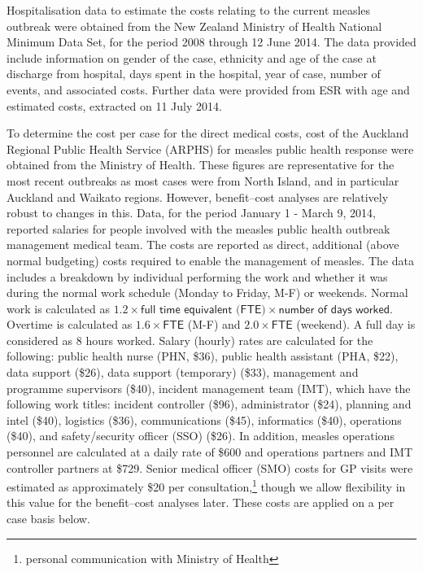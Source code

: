 \documentclass{article}
\begin{document}
Hospitalisation data to estimate the costs relating to the current measles outbreak were obtained from the New Zealand Ministry of Health National Minimum Data Set, for the period 2008 through 12 June 2014. The data provided include information on gender of the case, ethnicity and age of the case at discharge from hospital, days spent in the hospital, year of case, number of events, and associated costs. Further data were provided from ESR with age and estimated costs, extracted on 11 July 2014.

To determine the cost per case for the direct medical costs, cost of the Auckland Regional Public Health Service (ARPHS) for measles public health response were obtained from the Ministry of Health. These figures are representative for the most recent outbreaks as most cases were from North Island, and in particular Auckland and Waikato regions. However, benefit--cost analyses are relatively robust to changes in this. Data, for the period January 1 - March 9, 2014, reported salaries for people involved with the measles public health outbreak management medical team. The costs are reported as direct, additional (above normal budgeting) costs required to enable the management of measles. The data includes a breakdown by individual performing the work and whether it was during the normal work schedule (Monday to Friday, M-F) or weekends. Normal work is calculated as $1.2 \times \textsf{full time equivalent (FTE)} \times \textsf{number of days worked}$. Overtime is calculated as $1.6\times\textsf{FTE}$ (M-F) and $2.0 \times \textsf{FTE}$ (weekend). A full day is considered as 8 hours worked. Salary (hourly) rates are calculated for the following: public health nurse (PHN, \$36), public health assistant (PHA, \$22), data support (\$26), data support (temporary) (\$33), management and programme supervisors (\$40), incident management team (IMT), which have the following work titles: incident controller (\$96), administrator (\$24), planning and intel (\$40), logistics (\$36), communications (\$45), informatics (\$40), operations (\$40), and safety/security officer (SSO) (\$26). In addition, measles operations personnel are calculated at a daily rate of \$600 and operations partners and IMT controller partners at \$729. Senior medical officer (SMO) costs for GP visits were estimated as approximately \$20 per consultation,\footnote{personal communication with Ministry of Health} though we allow flexibility in this value for the benefit--cost analyses later. These costs are applied on a per case basis below.
\end{document}
